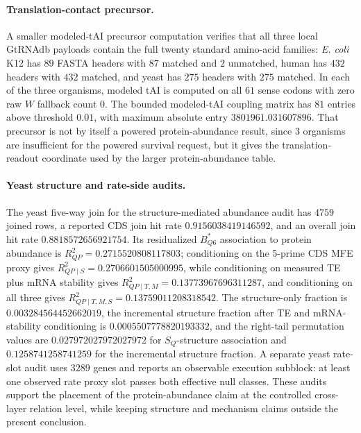 \paragraph{Translation-contact precursor.}
A smaller modeled-tAI precursor computation verifies that all three local GtRNAdb payloads contain the full twenty standard amino-acid families: \emph{E. coli} K12 has $89$ FASTA headers with $87$ matched and $2$ unmatched, human has $432$ headers with $432$ matched, and yeast has $275$ headers with $275$ matched. In each of the three organisms, modeled tAI is computed on all $61$ sense codons with zero raw $W$ fallback count $0$. The bounded modeled-tAI coupling matrix has $81$ entries above threshold $0.01$, with maximum absolute entry $3801961.031607896$. That precursor is not by itself a powered protein-abundance result, since $3$ organisms are insufficient for the powered survival request, but it gives the translation-readout coordinate used by the larger protein-abundance table.

\paragraph{Yeast structure and rate-side audits.}
The yeast five-way join for the structure-mediated abundance audit has $4759$ joined rows, a reported CDS join hit rate $0.9156038419146592$, and an overall join hit rate $0.8818572656921754$. Its residualized $B^{*}_{Q6}$ association to protein abundance is $R^2_{QP}=0.2715520808117803$; conditioning on the 5-prime CDS MFE proxy gives $R^2_{QP\mid S}=0.2706601505000995$, while conditioning on measured TE plus mRNA stability gives $R^2_{QP\mid T,M}=0.13773967696311287$, and conditioning on all three gives $R^2_{QP\mid T,M,S}=0.13759011208318542$. The structure-only fraction is $0.003284564452662019$, the incremental structure fraction after TE and mRNA-stability conditioning is $0.0005507778820193332$, and the right-tail permutation values are $0.027972027972027972$ for $S_Q$-structure association and $0.1258741258741259$ for the incremental structure fraction. A separate yeast rate-slot audit uses $3289$ genes and reports an observable execution subblock: at least one observed rate proxy slot passes both effective null classes. These audits support the placement of the protein-abundance claim at the controlled cross-layer relation level, while keeping structure and mechanism claims outside the present conclusion.

